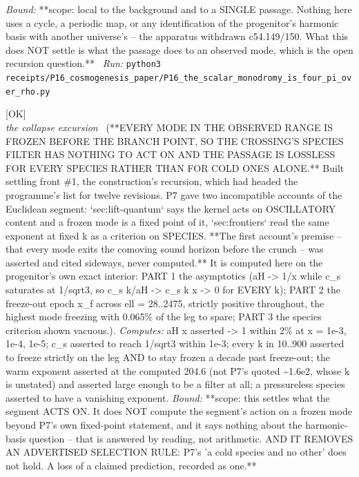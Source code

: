 \begin{description}
 \emph{Bound:} **scope: local to the background and to a SINGLE passage. Nothing here uses a cycle, a periodic map, or any identification of the progenitor's harmonic basis with another universe's -- the apparatus withdrawn c54.149/150. What this does NOT settle is what the passage does to an observed mode, which is the open recursion question.**
\ \emph{Run:} \texttt{python3 receipts/P16\_cosmogenesis\_paper/P16\_the\_scalar\_monodromy\_is\_four\_pi\_over\_rho.py}
\item[\label{rcpt:P16_every_mode_is_frozen_at_the_crossing}\texttt{P16\_every\_mode\_is\_frozen\_at\_the\_crossing}]\hfill\textsf{[OK]}\\
\textit{the collapse excursion} \ (**EVERY MODE IN THE OBSERVED RANGE IS FROZEN BEFORE THE BRANCH POINT, SO THE CROSSING'S SPECIES FILTER HAS NOTHING TO ACT ON AND THE PASSAGE IS LOSSLESS FOR EVERY SPECIES RATHER THAN FOR COLD ONES ALONE.** Built settling front \#1, the construction's recursion, which had headed the programme's list for twelve revisions. P7 gave two incompatible accounts of the Euclidean segment: `sec:lift-quantum` says the kernel acts on OSCILLATORY content and a frozen mode is a fixed point of it, `sec:frontiers` read the same exponent at fixed k as a criterion on SPECIES. **The first account's premise -- that every mode exits the comoving sound horizon before the crunch -- was asserted and cited sideways, never computed.** It is computed here on the progenitor's own exact interior: PART 1 the asymptotics (\textbar{}aH\textbar{} -> 1/x while c\_s saturates at 1/sqrt3, so c\_s k/\textbar{}aH\textbar{} -> c\_s k x -> 0 for EVERY k); PART 2 the freeze-out epoch x\_f across ell = 28..2475, strictly positive throughout, the highest mode freezing with 0.065\% of the leg to spare; PART 3 the species criterion shown vacuous.). 
\emph{Computes:} \textbar{}aH\textbar{} x asserted -> 1 within 2\% at x = 1e-3, 1e-4, 1e-5; c\_s asserted to reach 1/sqrt3 within 1e-3; every k in 10..900 asserted to freeze strictly on the leg AND to stay frozen a decade past freeze-out; the warm exponent asserted at the computed 204.6 (not P7's quoted \textasciitilde{}1.6e2, whose k is unstated) and asserted large enough to be a filter at all; a pressureless species asserted to have a vanishing exponent.
 \emph{Bound:} **scope: this settles what the segment ACTS ON. It does NOT compute the segment's action on a frozen mode beyond P7's own fixed-point statement, and it says nothing about the harmonic-basis question -- that is answered by reading, not arithmetic. AND IT REMOVES AN ADVERTISED SELECTION RULE: P7's 'a cold species and no other' does not hold. A loss of a claimed prediction, recorded as one.**

\end{description}
